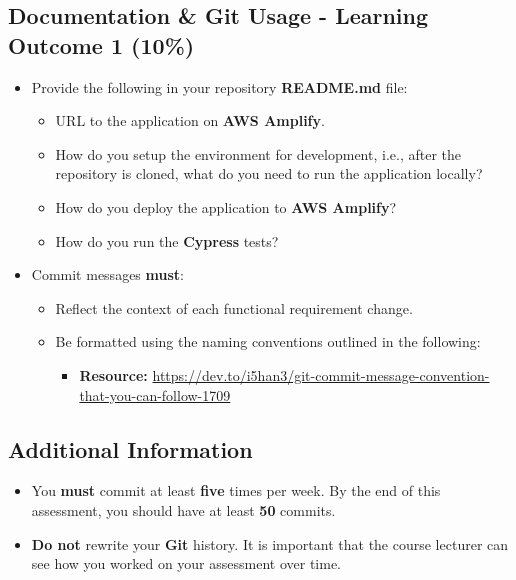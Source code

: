 \documentclass{article}
\begin{document}
\subsection*{Documentation \& Git Usage - Learning Outcome 1 (10\%)}
\begin{itemize}
    \item Provide the following in your repository \textbf{README.md} file:
    \begin{itemize}
        \item URL to the application on \textbf{AWS Amplify}.
        \item How do you setup the environment for development, i.e., after the repository is cloned, what do you need to run the application locally?
        \item How do you deploy the application to \textbf{AWS Amplify}?
        \item How do you run the \textbf{Cypress} tests?
    \end{itemize}
    \item Commit messages \textbf{must}:
    \begin{itemize}
      \item Reflect the context of each functional requirement change. 
      \item Be formatted using the naming conventions outlined in the following:
      \begin{itemize}
        \item \textbf{Resource:} \small\href{https://dev.to/i5han3/git-commit-message-convention-that-you-can-follow-1709}{https://dev.to/i5han3/git-commit-message-convention-that-you-can-follow-1709}
      \end{itemize} 
    \end{itemize}
  \end{itemize}
  
  \subsection*{Additional Information}
  \begin{itemize}
    \item You \textbf{must} commit at least \textbf{five} times per week. By the end of this assessment, you should have at least \textbf{50} commits.
    \item \textbf{Do not} rewrite your \textbf{Git} history. It is important that the course lecturer can see how you worked on your assessment over time. 
  \end{itemize}
\end{document}
